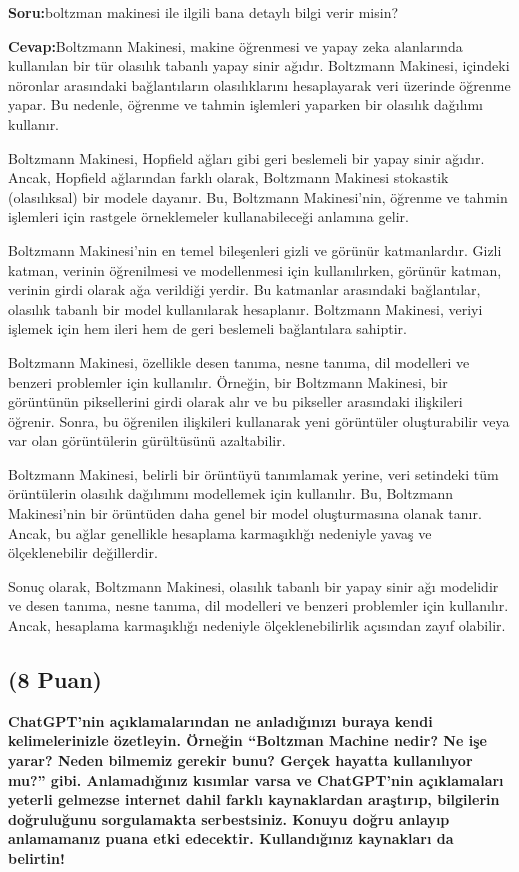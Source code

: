 \documentclass[11pt]{article}
\begin{document}
\textbf{Soru:}boltzman makinesi ile ilgili bana detaylı bilgi verir misin?

\textbf{Cevap:}Boltzmann Makinesi, makine öğrenmesi ve yapay zeka alanlarında kullanılan bir tür olasılık tabanlı yapay sinir ağıdır. Boltzmann Makinesi, içindeki nöronlar arasındaki bağlantıların olasılıklarını hesaplayarak veri üzerinde öğrenme yapar. Bu nedenle, öğrenme ve tahmin işlemleri yaparken bir olasılık dağılımı kullanır.

Boltzmann Makinesi, Hopfield ağları gibi geri beslemeli bir yapay sinir ağıdır. Ancak, Hopfield ağlarından farklı olarak, Boltzmann Makinesi stokastik (olasılıksal) bir modele dayanır. Bu, Boltzmann Makinesi'nin, öğrenme ve tahmin işlemleri için rastgele örneklemeler kullanabileceği anlamına gelir.

Boltzmann Makinesi'nin en temel bileşenleri gizli ve görünür katmanlardır. Gizli katman, verinin öğrenilmesi ve modellenmesi için kullanılırken, görünür katman, verinin girdi olarak ağa verildiği yerdir. Bu katmanlar arasındaki bağlantılar, olasılık tabanlı bir model kullanılarak hesaplanır. Boltzmann Makinesi, veriyi işlemek için hem ileri hem de geri beslemeli bağlantılara sahiptir.

Boltzmann Makinesi, özellikle desen tanıma, nesne tanıma, dil modelleri ve benzeri problemler için kullanılır. Örneğin, bir Boltzmann Makinesi, bir görüntünün piksellerini girdi olarak alır ve bu pikseller arasındaki ilişkileri öğrenir. Sonra, bu öğrenilen ilişkileri kullanarak yeni görüntüler oluşturabilir veya var olan görüntülerin gürültüsünü azaltabilir.

Boltzmann Makinesi, belirli bir örüntüyü tanımlamak yerine, veri setindeki tüm örüntülerin olasılık dağılımını modellemek için kullanılır. Bu, Boltzmann Makinesi'nin bir örüntüden daha genel bir model oluşturmasına olanak tanır. Ancak, bu ağlar genellikle hesaplama karmaşıklığı nedeniyle yavaş ve ölçeklenebilir değillerdir.

Sonuç olarak, Boltzmann Makinesi, olasılık tabanlı bir yapay sinir ağı modelidir ve desen tanıma, nesne tanıma, dil modelleri ve benzeri problemler için kullanılır. Ancak, hesaplama karmaşıklığı nedeniyle ölçeklenebilirlik açısından zayıf olabilir.


\subsection{(8 Puan)} \textbf{ChatGPT’nin açıklamalarından ne anladığınızı buraya kendi kelimelerinizle özetleyin. Örneğin ``Boltzman Machine nedir? Ne işe yarar? Neden bilmemiz gerekir bunu? Gerçek hayatta kullanılıyor mu?'' gibi. Anlamadığınız kısımlar varsa ve ChatGPT’nin açıklamaları yeterli gelmezse internet dahil farklı kaynaklardan araştırıp, bilgilerin doğruluğunu sorgulamakta serbestsiniz. Konuyu doğru anlayıp anlamamanız puana etki edecektir. Kullandığınız kaynakları da belirtin!}
\end{document}
